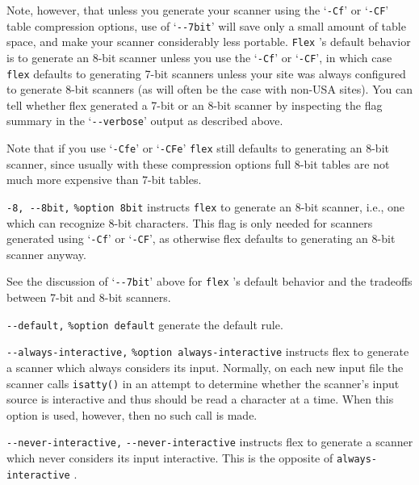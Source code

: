 \documentclass[openany,oneside]{book}
\begin{document}
Note, however, that unless you generate your scanner using the
‘\verb`-Cf`’ or ‘\verb`-CF`’ table compression options, use of ‘\verb`--7bit`’
will save only a small amount of table space, and make your scanner
considerably less portable. \verb`Flex` 's default behavior is to
generate an 8-bit scanner unless you use the ‘\verb`-Cf`’ or ‘\verb`-CF`’,
in which case \verb`flex` defaults to generating 7-bit scanners unless
your site was always configured to generate 8-bit scanners (as will
often be the case with non-USA sites).  You can tell whether flex
generated a 7-bit or an 8-bit scanner by inspecting the flag summary in
the ‘\verb`--verbose`’ output as described above.

Note that if you use ‘\verb`-Cfe`’ or ‘\verb`-CFe`’ \verb`flex` still
defaults to generating an 8-bit scanner, since usually with these
compression options full 8-bit tables are not much more expensive than
7-bit tables.

\verb`-8, --8bit,` \verb`%option 8bit` instructs \verb`flex` to generate an 8-bit scanner, i.e., one which can
recognize 8-bit characters.  This flag is only needed for scanners
generated using ‘\verb`-Cf`’ or ‘\verb`-CF`’, as otherwise flex defaults to
generating an 8-bit scanner anyway.

See the discussion of
‘\verb`--7bit`’
above for \verb`flex` 's default behavior and the tradeoffs between 7-bit
and 8-bit scanners.

\verb`--default,` \verb`%option default` generate the default rule.

\verb`--always-interactive,` \verb`%option always-interactive` instructs flex to generate a scanner which always considers its input.  Normally, on each new input file the scanner calls \verb`isatty()` in an attempt to determine whether the scanner's input
source is interactive and thus should be read a character at a time. 
When this option is used, however, then no such call is made.

\verb`--never-interactive,` \verb`--never-interactive` instructs flex to generate a scanner which never considers its input
interactive.  This is the opposite of \verb`always-interactive` .
\end{document}
